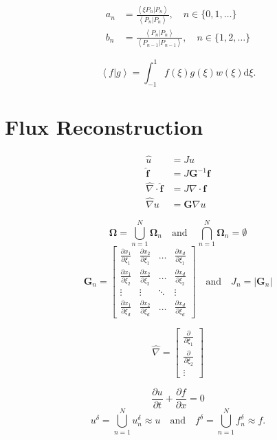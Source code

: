 \documentclass[12pt]{article}
\newcommand\px[2]{\frac{\partial #1}{\partial {#2}}}
\newcommand\rint[2]{\int^{1}_{-1}{#1} \mathrm{d}{#2}}
\newcommand\abracket[1]{\left\langle{#1}\right\rangle}
\newcommand\inprod[2]{\abracket{#1|#2}}
\begin{document}
	\begin{align}
		a_n &= \frac{\inprod{\xi P_n}{P_n}}{\inprod{P_n}{P_n}}, \quad n\in\{0,1,\dots\}\\
		b_n &= \frac{\inprod{P_n}{P_n}}{\inprod{P_{n-1}}{P_{n-1}}}, \quad n\in\{1,2,\dots\}
	\end{align}

	\begin{equation}
		\inprod{f}{g} = \rint{f(\xi)g(\xi)w(\xi)}{\xi}.
	\end{equation}
	
\section{Flux Reconstruction}
	\begin{align}
		\hat{u} &= Ju \\
		\hat{\mathbf{f}} &= J\mathbf{G}^{-1}\mathbf{f} \\
		\hat{\nabla}\cdot\hat{\mathbf{f}} &= J \nabla\cdot\mathbf{f} \\
		\hat{\nabla}u &= \mathbf{G}\nabla u
	\end{align}
	
	\begin{equation}
		\mathbf{\Omega} = \bigcup^N_{n=1}\mathbf{\Omega}_n \quad \mathrm{and} \quad \bigcap^N_{n=1}\mathbf{\Omega}_n = \emptyset
	\end{equation}	
	\begin{equation}
		\mathbf{G}_n = \begin{bmatrix}
			\px{x_1}{\xi_1} & \px{x_2}{\xi_1} & \dots & \px{x_d}{\xi_1} \\
			\px{x_1}{\xi_2} & \px{x_2}{\xi_2} & \dots & \px{x_d}{\xi_2} \\
			\vdots & \vdots & \ddots & \vdots \\
			\px{x_1}{\xi_d} & \px{x_2}{\xi_d} & \dots & \px{x_d}{\xi_d}
		\end{bmatrix} \quad \mathrm{and} \quad J_n = |\mathbf{G}_n| 
	\end{equation} 
	
	\begin{equation}
		\hat{\nabla} = \begin{bmatrix}
			\px{}{\xi_1} \\
			\px{}{\xi_2} \\
			\vdots
		\end{bmatrix}
	\end{equation}
	
	\begin{equation}
		\px{u}{t}  + \px{f}{x} = 0
	\end{equation}
	\begin{equation}
		u^\delta = \bigcup^N_{n=1}u^\delta_n \approx u \quad \mathrm{and} \quad f^\delta = \bigcup^N_{n=1}f^\delta_n \approx f.
	\end{equation}
	
\end{document}
